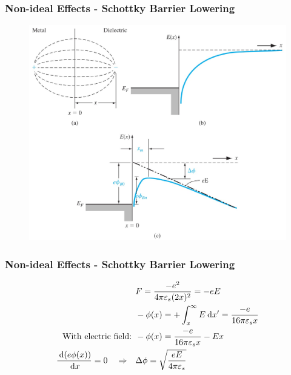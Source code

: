 \documentclass{beamer}
\begin{document}
    \begin{frame} \frametitle{Non-ideal Effects - Schottky Barrier Lowering}
        \begin{figure}[H]
            \centering
            \includegraphics[width=0.9\linewidth]{Schottky-barrier-lowering.jpg}
            \label{fig:Schottky-barrier-lowering.jpg}
        \end{figure}
    \end{frame}
    \begin{frame} \frametitle{Non-ideal Effects - Schottky Barrier Lowering}
        \begin{equation*}
            \begin{aligned}
                &F = \frac{-e^2}{4 \pi \varepsilon_s (2x)^2} = -eE \\
                &-\phi(x) = + \int_x^\infty E \: \mathrm{d} x^\prime = \frac{-e}{16\pi \varepsilon_s x} \\ 
                \text{With electric field: } & -\phi(x) = \frac{-e}{16 \pi \varepsilon_s x} - Ex  \\
                \frac{\: \mathrm{d} (e \phi(x))}{\: \mathrm{d} x} = 0 \quad \Rightarrow \quad & \Delta \phi = \sqrt{\frac{eE}{4\pi \varepsilon_s} }  
            \end{aligned}
        \end{equation*}
    \end{frame}
\end{document}
